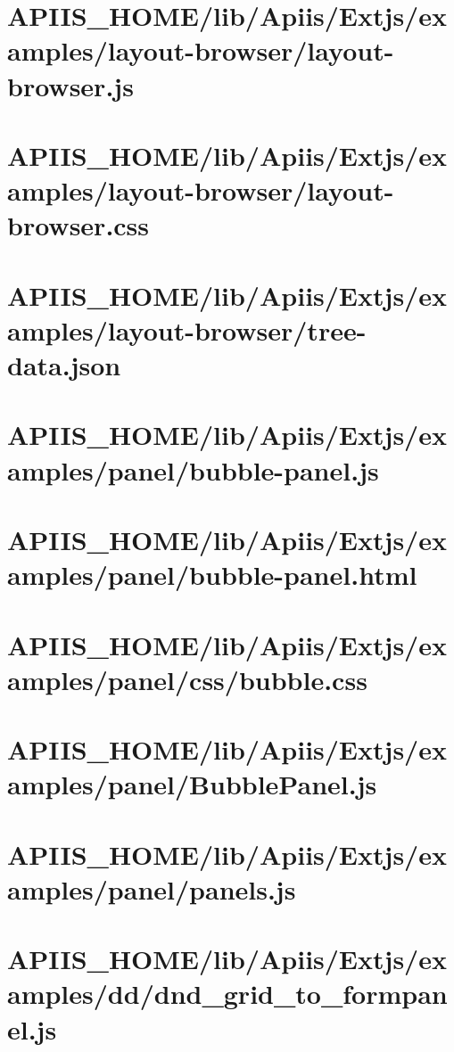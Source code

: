 \section{APIIS\_HOME/lib/Apiis/Extjs/examples/layout-browser/layout-browser.js} 
\section{APIIS\_HOME/lib/Apiis/Extjs/examples/layout-browser/layout-browser.css} 
\section{APIIS\_HOME/lib/Apiis/Extjs/examples/layout-browser/tree-data.json} 
\section{APIIS\_HOME/lib/Apiis/Extjs/examples/panel/bubble-panel.js} 
\section{APIIS\_HOME/lib/Apiis/Extjs/examples/panel/bubble-panel.html} 
\section{APIIS\_HOME/lib/Apiis/Extjs/examples/panel/css/bubble.css} 
\section{APIIS\_HOME/lib/Apiis/Extjs/examples/panel/BubblePanel.js} 
\section{APIIS\_HOME/lib/Apiis/Extjs/examples/panel/panels.js} 
\section{APIIS\_HOME/lib/Apiis/Extjs/examples/dd/dnd\_grid\_to\_formpanel.js} 
